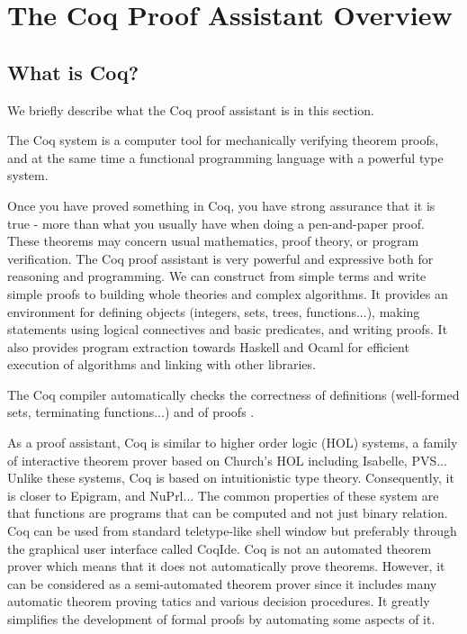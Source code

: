\section{The Coq Proof Assistant Overview}
\subsection{What is Coq?}
We briefly describe what the Coq proof assistant is in this section.

The Coq system is a computer tool for mechanically verifying theorem
proofs, and at the same time a functional programming language with a
powerful type system.

Once you have proved something in Coq, you
have strong assurance that it is true - more than what you usually
have when doing a pen-and-paper proof. These theorems may concern
usual mathematics, proof theory, or program verification. The Coq
proof assistant is very powerful and expressive both for reasoning
and programming. We can construct from simple terms and write simple
proofs to building whole theories and complex algorithms. It provides
an environment for defining objects (integers, sets, trees,
functions...), making statements using logical connectives and basic
predicates, and writing proofs. It also provides program extraction
towards Haskell and Ocaml for efficient execution of algorithms and
linking with other libraries.

The Coq compiler automatically checks the correctness of definitions
(well-formed sets, terminating functions...) and of proofs \cite{paulin2012introduction}.

As a proof assistant, Coq is similar to higher order logic (HOL)
systems, a family of interactive theorem prover based on Church's HOL
including Isabelle, PVS... Unlike these systems, Coq is based on
intuitionistic type theory. Consequently, it is closer to Epigram, and
NuPrl... The common properties of these system are that functions are
programs that can be computed and not just binary relation.  Coq can
be used from standard teletype-like shell window but preferably
through the graphical user interface called CoqIde. Coq is not an
automated theorem prover which means that it does not automatically
prove theorems. However, it can be considered as a semi-automated
theorem prover since it includes many automatic theorem proving tatics
and various decision procedures. It greatly simplifies the development
of formal proofs by automating some aspects of it.

